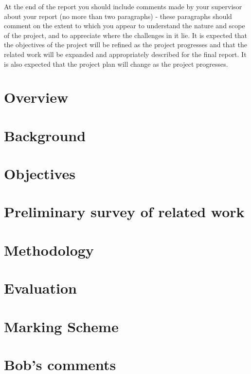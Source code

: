 \documentclass[a4paper]{report}
\begin{document}
	At the end of the report you should include comments made by your supervisor about your
	report (no more than two paragraphs) - these paragraphs should comment on the extent
	to which you appear to understand the nature and scope of the project, and to
	appreciate where the challenges in it lie.
	It is expected that the objectives of the project will be refined as the project
	progresses and that the related work will be expanded and appropriately described
	for the final report. It is also expected that the project plan will change as the
	project progresses.
\section{Overview}
\section{Background}
\section{Objectives}
\section{Preliminary survey of related work}
\section{Methodology}
\section{Evaluation}
\section{Marking Scheme}
\section{Bob's comments}

% 
% 
\end{document}
